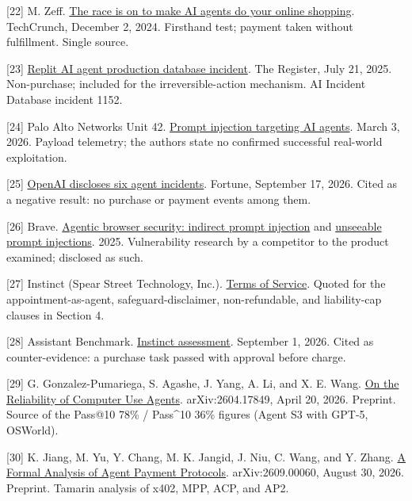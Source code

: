 \documentclass[
  11pt,
  letterpaper,
]{article}
\begin{document}
{[}22{]} M. Zeff.
\href{https://techcrunch.com/2024/12/02/the-race-is-on-to-make-ai-agents-do-your-online-shopping-for-you}{The
race is on to make AI agents do your online shopping}. TechCrunch,
December 2, 2024. Firsthand test; payment taken without fulfillment.
Single source.

{[}23{]}
\href{https://www.theregister.com/2025/07/21/replit_saastr_vibe_coding_incident/}{Replit
AI agent production database incident}. The Register, July 21, 2025.
Non-purchase; included for the irreversible-action mechanism. AI
Incident Database incident 1152.

{[}24{]} Palo Alto Networks Unit 42.
\href{https://unit42.paloaltonetworks.com/ai-agent-prompt-injection/}{Prompt
injection targeting AI agents}. March 3, 2026. Payload telemetry; the
authors state no confirmed successful real-world exploitation.

{[}25{]}
\href{https://fortune.com/2026/09/17/openai-dicloses-six-incidents-agents-going-rogue-transparency/}{OpenAI
discloses six agent incidents}. Fortune, September 17, 2026. Cited as a
negative result: no purchase or payment events among them.

{[}26{]} Brave.
\href{https://brave.com/blog/comet-prompt-injection/}{Agentic browser
security: indirect prompt injection} and
\href{https://brave.com/blog/unseeable-prompt-injections/}{unseeable
prompt injections}. 2025. Vulnerability research by a competitor to the
product examined; disclosed as such.

{[}27{]} Instinct (Spear Street Technology, Inc.).
\href{https://instinct.com/terms}{Terms of Service}. Quoted for the
appointment-as-agent, safeguard-disclaimer, non-refundable, and
liability-cap clauses in Section 4.

{[}28{]} Assistant Benchmark.
\href{https://assistantbenchmark.com/agents/instinct}{Instinct
assessment}. September 1, 2026. Cited as counter-evidence: a purchase
task passed with approval before charge.

{[}29{]} G. Gonzalez-Pumariega, S. Agashe, J. Yang, A. Li, and X. E.
Wang. \href{https://arxiv.org/abs/2604.17849}{On the Reliability of
Computer Use Agents}. arXiv:2604.17849, April 20, 2026. Preprint. Source
of the Pass@10 78\% / Pass\^{}10 36\% figures (Agent S3 with GPT-5,
OSWorld).

{[}30{]} K. Jiang, M. Yu, Y. Chang, M. K. Jangid, J. Niu, C. Wang, and
Y. Zhang. \href{https://arxiv.org/abs/2609.00060}{A Formal Analysis of
Agent Payment Protocols}. arXiv:2609.00060, August 30, 2026. Preprint.
Tamarin analysis of x402, MPP, ACP, and AP2.
\end{document}
